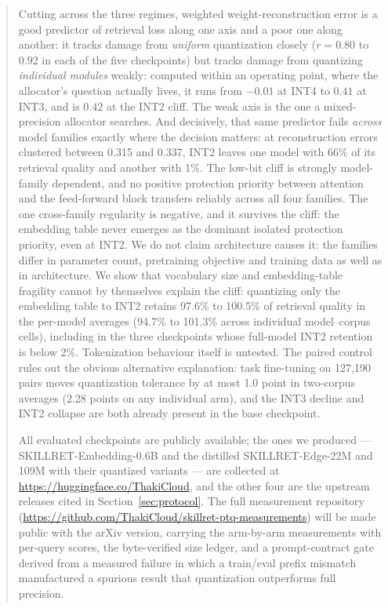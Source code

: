 \documentclass[11pt]{article}
\begin{document}
\begin{abstract}
Cutting across the three regimes,
weighted weight-reconstruction error is a good predictor of retrieval loss along one axis and
a poor one along another: it tracks damage from \emph{uniform} quantization closely
($r=0.80$ to $0.92$ in each of the five checkpoints) but tracks damage from quantizing
\emph{individual modules} weakly: computed within an operating point, where the allocator's
question actually lives, it runs from $-0.01$ at INT4 to $0.41$ at INT3, and is $0.42$ at the
INT2 cliff. The weak axis is the one a mixed-precision
allocator searches. And decisively, that same predictor fails \emph{across} model families exactly
where the decision matters: at reconstruction errors clustered between 0.315 and 0.337,
INT2 leaves one model with 66\% of its retrieval quality and another with 1\%. The low-bit cliff is strongly model-family
dependent, and no positive protection priority between attention and the
feed-forward block transfers reliably across all four families. The one cross-family
regularity is negative, and it survives the cliff: the embedding table never emerges as the dominant
isolated protection priority, even at INT2. We do not claim
architecture causes it: the families differ in parameter count, pretraining objective and
training data as well as in architecture. We show that vocabulary size and embedding-table fragility cannot by
themselves explain the cliff: quantizing only the embedding table to INT2 retains 97.6\% to
100.5\% of retrieval quality in the per-model averages (94.7\% to 101.3\% across individual
model--corpus cells), including in the three checkpoints whose full-model INT2 retention is
below 2\%. Tokenization behaviour itself is untested. The paired control rules out the obvious alternative explanation: task fine-tuning
on 127{,}190 pairs moves quantization tolerance by at most 1.0 point in two-corpus averages
(2.28 points on any individual arm), and the INT3 decline
and INT2 collapse are both already present in the base checkpoint.

All evaluated checkpoints are publicly available; the ones we produced --- SKILLRET-Embedding-0.6B
and the distilled SKILLRET-Edge-22M and 109M with their quantized variants --- are collected
at \url{https://huggingface.co/ThakiCloud}, and the other four are the upstream releases cited
in Section~\ref{sec:protocol}. The full measurement repository (\url{https://github.com/ThakiCloud/skillret-ptq-measurements})
will be made public with the arXiv version, carrying the arm-by-arm measurements with per-query scores,
the byte-verified size ledger, and a prompt-contract gate derived from a measured failure in
which a train/eval prefix mismatch manufactured a spurious result that quantization
outperforms full precision.
\end{abstract}
\end{document}

